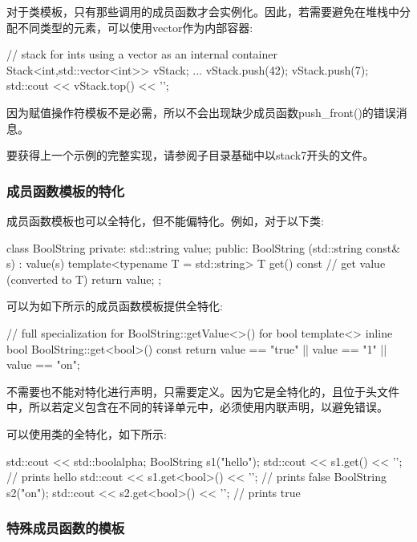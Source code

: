 对于类模板，只有那些调用的成员函数才会实例化。因此，若需要避免在堆栈中分配不同类型的元素，可以使用vector作为内部容器:

\begin{cpp}
// stack for ints using a vector as an internal container
Stack<int,std::vector<int>> vStack;
...
vStack.push(42);
vStack.push(7);
std::cout << vStack.top() << '\n';
\end{cpp}

因为赋值操作符模板不是必需，所以不会出现缺少成员函数push\_front()的错误消息。

要获得上一个示例的完整实现，请参阅子目录基础中以stack7开头的文件。

\subsubsection{成员函数模板的特化}

成员函数模板也可以全特化，但不能偏特化。例如，对于以下类:

\begin{cpp}
class BoolString {
private:
	std::string value;
public:
	BoolString (std::string const& s)
	: value(s) {
	}
	template<typename T = std::string>
	T get() const { // get value (converted to T)
		return value;
	}
};
\end{cpp}

可以为如下所示的成员函数模板提供全特化:

\begin{cpp}
// full specialization for BoolString::getValue<>() for bool
template<>
inline bool BoolString::get<bool>() const {
	return value == "true" || value == "1" || value == "on";
}
\end{cpp}

不需要也不能对特化进行声明，只需要定义。因为它是全特化的，且位于头文件中，所以若定义包含在不同的转译单元中，必须使用内联声明，以避免错误。

可以使用类的全特化，如下所示:

\begin{cpp}
std::cout << std::boolalpha;
BoolString s1("hello");
std::cout << s1.get() << '\n'; // prints hello
std::cout << s1.get<bool>() << '\n'; // prints false
BoolString s2("on");
std::cout << s2.get<bool>() << '\n'; // prints true
\end{cpp}

\subsubsection{特殊成员函数的模板}

